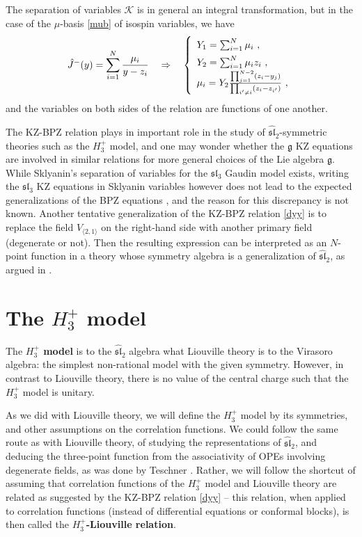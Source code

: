 \documentclass[12pt, a4paper, notitlepage, twoside]{report}
\numberwithin{equation}{section}
\theoremstyle{break}
\begin{document}
The separation of variables $\mathcal{K}$ is in general an integral transformation, but in the case of the $\mu$-basis \eqref{mub} of isospin variables, we have 
\begin{align}
\renewcommand{\arraystretch}{1.5}
 \hat{J}^-(y) = \sum_{i=1}^N \frac{\mu_i}{y-z_i} \quad \Rightarrow \quad \left\{\begin{array}{l}  Y_1 =\sum_{i=1}^N \mu_i\ , \\ Y_2 = \sum_{i=1}^N \mu_i z_i\ , \\ \mu_i = Y_2\frac{\prod_{j=1}^{N-2}(z_i-y_j)}{\prod_{i'\neq i}(z_i-z_{i'})}\ ,\end{array}\right. 
\label{my}
\end{align}
and the variables on both sides of the relation are functions of one another. 

The KZ-BPZ relation plays in important role in the study of $\widehat{\mathfrak{sl}}_2$-symmetric theories such as the $H_3^+$ model, and one may wonder whether the $\mathfrak{g}$ KZ equations are involved in similar relations for more general choices of the Lie algebra $\mathfrak{g}$.
While Sklyanin's separation of variables for the $\mathfrak{sl}_3$ Gaudin model exists, writing the $\mathfrak{sl}_3$ KZ equations in Sklyanin variables however does not lead to the expected generalizations of the BPZ equations \cite{rib08b}, and the reason for this discrepancy is not known. 
Another tentative generalization of the KZ-BPZ relation \eqref{dyy} is to replace the field $V_{\langle 2,1\rangle}$ on the right-hand side with another primary field (degenerate or not).
Then the resulting expression can be interpreted as an $N$-point function in a theory whose symmetry algebra is a generalization of $\widehat{\mathfrak{sl}}_2$, as argued in \cite{rib08}.


\section{The \texorpdfstring{$H_3^+$}{H3+} model \label{sechtp}}

The \textbf{\boldmath $H_3^+$ model} is to the $\widehat{\mathfrak{sl}}_2$ algebra what Liouville theory is to the Virasoro algebra: the simplest non-rational model with the given symmetry.
However, in contrast to Liouville theory, there is no value of the central charge such that the $H_3^+$ model is unitary. 

As we did with Liouville theory, we will define the $H_3^+$ model by its symmetries, and other assumptions on the correlation functions.
We could follow the same route as with Liouville theory, of studying the representations of $\widehat{\mathfrak{sl}}_2$, and deducing the three-point function from the associativity of OPEs involving degenerate fields, as was done by Teschner \cite{tes97a}.
Rather, we will follow the shortcut of assuming that correlation functions of the $H_3^+$ model and Liouville theory are related as suggested by the KZ-BPZ relation \eqref{dyy} -- this relation, when applied to correlation functions (instead of differential equations or conformal blocks), is then called the \textbf{\boldmath $H_3^+$-Liouville relation}.
\end{document}
